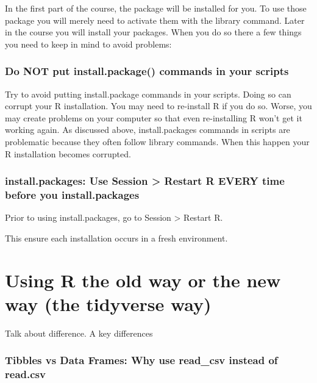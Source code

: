 \documentclass[
]{krantz}
\begin{document}
In the first part of the course, the package will be installed for you. To use those package you will merely need to activate them with the library command. Later in the course you will install your packages. When you do so there a few things you need to keep in mind to avoid problems:

\hypertarget{do-not-put-install.package-commands-in-your-scripts}{%
\subsubsection{Do NOT put install.package() commands in your scripts}\label{do-not-put-install.package-commands-in-your-scripts}}

Try to avoid putting install.package commands in your scripts. Doing so can corrupt your R installation. You may need to re-install R if you do so. Worse, you may create problems on your computer so that even re-installing R won't get it working again. As discussed above, install.packages commands in scripts are problematic because they often follow library commands. When this happen your R installation becomes corrupted.

\hypertarget{install.packages-use-session-restart-r-every-time-before-you-install.packages}{%
\subsubsection{install.packages: Use Session \textgreater{} Restart R EVERY time before you install.packages}\label{install.packages-use-session-restart-r-every-time-before-you-install.packages}}

Prior to using install.packages, go to Session \textgreater{} Restart R.

This ensure each installation occurs in a fresh environment.

\hypertarget{using-r-the-old-way-or-the-new-way-the-tidyverse-way}{%
\section{Using R the old way or the new way (the tidyverse way)}\label{using-r-the-old-way-or-the-new-way-the-tidyverse-way}}

Talk about difference. A key differences

\hypertarget{tibbles-vs-data-frames-why-use-read_csv-instead-of-read.csv}{%
\subsubsection{Tibbles vs Data Frames: Why use read\_csv instead of read.csv}\label{tibbles-vs-data-frames-why-use-read_csv-instead-of-read.csv}}
\end{document}
